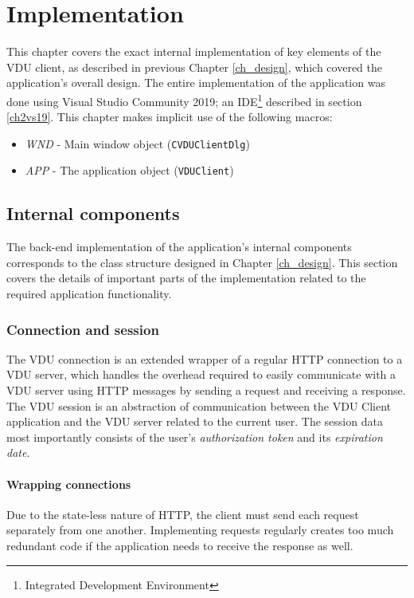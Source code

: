 \chapter{Implementation}
\label{ch_implementation}
This chapter covers the exact internal implementation of key elements of the VDU client, as described in previous Chapter \ref{ch_design}, which covered the application's overall design. The entire implementation of the application was done using Visual Studio Community 2019; an IDE\footnote{Integrated Development Environment} described in section \ref{ch2vs19}. This chapter makes implicit use of the following macros:
\begin{itemize}
    \item \textit{WND} - Main window object (\lstinline{CVDUClientDlg})
    \item \textit{APP} - The application object (\lstinline{VDUClient})
\end{itemize}

\section{Internal components}
The back-end implementation of the application's internal components corresponds to the class structure designed in Chapter \ref{ch_design}. This section covers the details of important parts of the implementation related to the required application functionality.

\subsection{Connection and session}
The VDU connection is an extended wrapper of a regular HTTP connection to a VDU server, which handles the overhead required to easily communicate with a VDU server using HTTP messages by sending a request and receiving a response. The VDU session is an abstraction of communication between the VDU Client application and the VDU server related to the current user. The session data most importantly consists of the user's \textit{authorization token} and its \textit{expiration date}. 

\subsubsection{Wrapping connections}
Due to the state-less nature of HTTP, the client must send each request separately from one another. Implementing requests regularly creates too much redundant code if the application needs to receive the response as well. 

